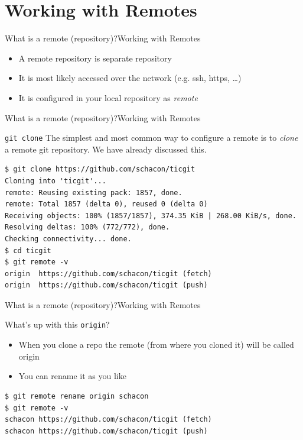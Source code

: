 \documentclass[aspectratio=169]{beamer}
\renewcommand{\footnotesize}{\tiny}
\newcommand{\sectiontitle}{}
\newcommand{\newsection}[1]{\renewcommand{\sectiontitle}{#1}\section{#1}}
\begin{document}
\newsection{Working with Remotes}
\begin{frame}{What is a remote (repository)?}{\sectiontitle}
\begin{itemize}
    \item A remote repository is separate repository
    \item It is most likely accessed over the network (e.g. ssh, https, \ldots)
    \item It is configured in your local repository as \emph{remote}
\end{itemize}
\end{frame}

\begin{frame}[fragile]{What is a remote (repository)?}{\sectiontitle}
\begin{block}{\texttt{git clone}}
The simplest and most common way to configure a remote is to \emph{clone} a
remote git repository. We have already discussed this.
\begin{verbatim}
$ git clone https://github.com/schacon/ticgit
Cloning into 'ticgit'...
remote: Reusing existing pack: 1857, done.
remote: Total 1857 (delta 0), reused 0 (delta 0)
Receiving objects: 100% (1857/1857), 374.35 KiB | 268.00 KiB/s, done.
Resolving deltas: 100% (772/772), done.
Checking connectivity... done.
$ cd ticgit
$ git remote -v
origin	https://github.com/schacon/ticgit (fetch)
origin	https://github.com/schacon/ticgit (push)
\end{verbatim}
\end{block}
\end{frame}

\begin{frame}[fragile]{What is a remote (repository)?}{\sectiontitle}
\begin{block}{What's up with this \texttt{origin}?}
\begin{itemize}
    \item When you clone a repo the remote (from where you cloned it) will be called origin
    \item You can rename it as you like
\end{itemize}
\end{block}
\begin{verbatim}
$ git remote rename origin schacon
$ git remote -v
schacon	https://github.com/schacon/ticgit (fetch)
schacon	https://github.com/schacon/ticgit (push)
\end{verbatim}
\end{frame}
\end{document}
